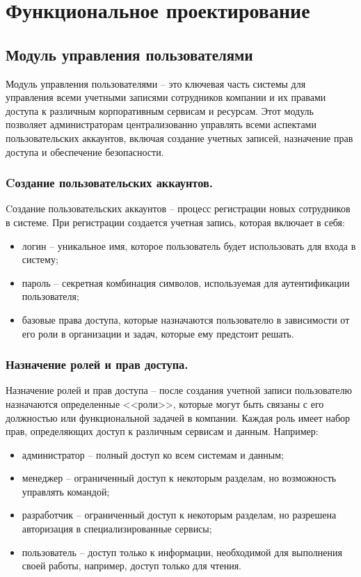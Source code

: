 \section{Функциональное проектирование}

\subsection{Модуль управления пользователями}
\label{sec:user_management_functionality}

Модуль управления пользователями -- это ключевая часть системы для управления всеми учетными записями сотрудников компании и их правами доступа к различным корпоративным сервисам и ресурсам. Этот модуль позволяет администраторам централизованно управлять всеми аспектами пользовательских аккаунтов, включая создание учетных записей, назначение прав доступа и обеспечение безопасности.

\subsubsection{Cоздание пользовательских аккаунтов.} Cоздание пользовательских аккаунтов -- процесс регистрации новых сотрудников в системе. При регистрации создается учетная запись, которая включает в себя:
\begin{itemize}
    \item логин -- уникальное имя, которое пользователь будет использовать для входа в систему;
    \item пароль -- секретная комбинация символов, используемая для аутентификации пользователя;
    \item базовые права доступа, которые назначаются пользователю в зависимости от его роли в организации и задач, которые ему предстоит решать.
\end{itemize}

\subsubsection{Назначение ролей и прав доступа.} Назначение ролей и прав доступа -- после создания учетной записи пользователю назначаются определенные <<роли>>, которые могут быть связаны с его должностью или функциональной задачей в компании. Каждая роль имеет набор прав, определяющих доступ к различным сервисам и данным. Например:
\begin{itemize}
    \item администратор -- полный доступ ко всем системам и данным;
    \item менеджер -- ограниченный доступ к некоторым разделам, но возможность управлять командой;
    \item разработчик -- ограниченный доступ к некоторым разделам, но разрешена авторизация в специализированные сервисы;
    \item пользователь -- доступ только к информации, необходимой для выполнения своей работы, например, доступ только для чтения.
\end{itemize}


